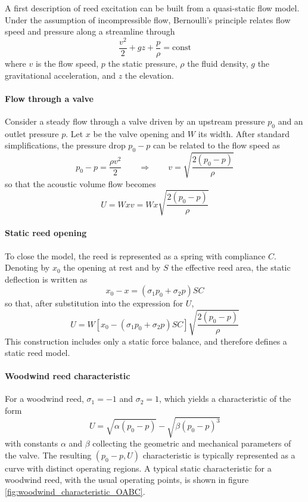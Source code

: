 A first description of reed excitation can be built from a quasi-static flow model. Under the assumption of incompressible flow, Bernoulli’s principle relates flow speed and pressure along a streamline through
\[
\frac{v^2}{2} + gz + \frac{p}{\rho} = \text{const}
\]
where \( v \) is the flow speed, \( p \) the static pressure, \( \rho \) the fluid density, \( g \) the gravitational acceleration, and \( z \) the elevation. 

\paragraph{Flow through a valve} Consider a steady flow through a valve driven by an upstream pressure \( p_0 \) and an outlet pressure \( p \). Let \( x \) be the valve opening and \( W \) its width. After standard simplifications, the pressure drop \( p_0 - p \) can be related to the flow speed as
\[
p_0 - p = \frac{\rho v^2}{2}
\qquad
\Rightarrow
\qquad
v = \sqrt{\frac{2(p_0 - p)}{\rho}}
\]
so that the acoustic volume flow becomes
\[
U = Wxv = Wx\sqrt{\frac{2(p_0 - p)}{\rho}}
\]

\paragraph{Static reed opening} To close the model, the reed is represented as a spring with compliance \( C \). Denoting by \( x_0 \) the opening at rest and by \( S \) the effective reed area, the static deflection is written as
\[
x_0 - x = (\sigma_1 p_0 + \sigma_2 p)SC
\]
so that, after substitution into the expression for \( U \),
\[
U = W\left[x_0 - (\sigma_1 p_0 + \sigma_2 p)SC\right]\sqrt{\frac{2(p_0 - p)}{\rho}}
\]
This construction includes only a static force balance, and therefore defines a static reed model. 

\paragraph{Woodwind reed characteristic} For a woodwind reed, \( \sigma_1 = -1 \) and \( \sigma_2 = 1 \), which yields a characteristic of the form
\[
U = \sqrt{\alpha(p_0 - p)} - \sqrt{\beta(p_0 - p)^3}
\]
with constants \( \alpha \) and \( \beta \) collecting the geometric and mechanical parameters of the valve. The resulting \( (p_0 - p, U) \) characteristic is typically represented as a curve with distinct operating regions. A typical static characteristic for a woodwind reed, with the usual operating points, is shown in figure \ref{fig:woodwind_characteristic_OABC}.

